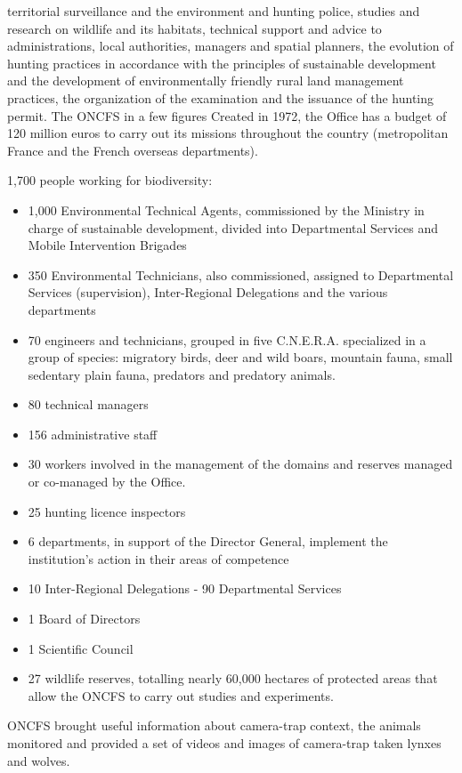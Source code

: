 territorial surveillance and the environment and hunting police,
studies and research on wildlife and its habitats,
technical support and advice to administrations, local authorities, managers and spatial planners,
the evolution of hunting practices in accordance with the principles of sustainable development and the development of environmentally friendly rural land management practices,
the organization of the examination and the issuance of the hunting permit. 
The ONCFS in a few figures
Created in 1972, the Office has a budget of 120 million euros to carry out its missions throughout the country (metropolitan France and the French overseas departments). 

1,700 people working for biodiversity:
\begin{itemize}
  \item 1,000 Environmental Technical Agents, commissioned by the Ministry in charge of sustainable development, divided into Departmental Services and Mobile Intervention Brigades
  \item 350 Environmental Technicians, also commissioned, assigned to Departmental Services (supervision), Inter-Regional Delegations and the various departments
  \item 70 engineers and technicians, grouped in five C.N.E.R.A. specialized in a group of species: migratory birds, deer and wild boars, mountain fauna, small sedentary plain fauna, predators and predatory animals.
  \item 80 technical managers
  \item 156 administrative staff
  \item 30 workers involved in the management of the domains and reserves managed or co-managed by the Office.
  \item 25 hunting licence inspectors
  \item 6 departments, in support of the Director General, implement the institution's action in their areas of competence
  \item 10 Inter-Regional Delegations - 90 Departmental Services
  \item 1 Board of Directors
  \item 1 Scientific Council
  \item 27 wildlife reserves, totalling nearly 60,000 hectares of protected areas that allow the ONCFS to carry out studies and experiments.
\end{itemize}

ONCFS brought useful information about camera-trap context, the animals monitored and provided a set of videos and images of camera-trap taken lynxes and wolves.


